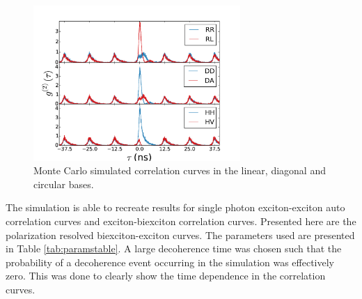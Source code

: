 \documentclass[12pt, twoside]{article}
\numberwithin{equation}{section}
\begin{document}
\begin{figure}[h!]
    \centering
    \includegraphics[width=0.7\textwidth]{images/correlations.pdf}
    \caption{Monte Carlo simulated correlation curves in the linear, diagonal and circular bases.}
    \label{fig:correlationssim}
\end{figure}

The simulation is able to recreate results for single photon
exciton-exciton auto correlation curves and exciton-biexciton
correlation curves. Presented here are the polarization resolved
biexciton-exciton curves. The parameters used are presented in Table
\ref{tab:paramstable}. A large decoherence time was chosen such that the
probability of a decoherence event occurring in the simulation was
effectively zero. This was done to clearly show the time dependence in
the correlation curves.
\end{document}
